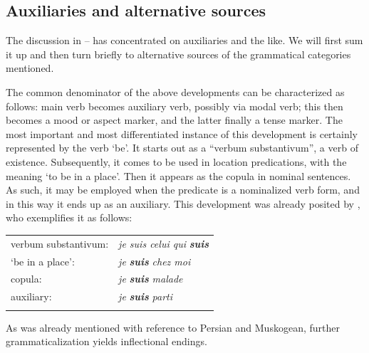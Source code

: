 \subsection{Auxiliaries and alternative sources} \label{sec:3.1.6}

The discussion in -- has concentrated on auxiliaries and the like. We will first sum it up and then turn briefly to alternative sources of the grammatical categories mentioned.

The common denominator of the above developments can be characterized as follows: main verb becomes auxiliary verb, possibly via modal verb; this then becomes a mood or aspect marker, and the latter finally a tense marker. The most important and most differentiated instance of this development is certainly represented by the verb ‘be’. It starts out as a ``verbum substantivum'', a verb of existence. Subsequently, it comes to be used in location predications, with the meaning ‘to be in a place’. Then it appears as the copula in nominal sentences. As such, it may be employed when the predicate is a nominalized verb form, and in this way it ends up as an auxiliary. This development was already posited by \citet[131]{Meillet1912}, who exemplifies it as follows:\enlargethispage{2\baselineskip}

\begin{longtable}{ll}
\lsptoprule
verbum substantivum: & \textit{je suis celui qui }\textbf{\textit{suis}}\\
‘be in a place’: & \textit{je }\textbf{\textit{suis}}\textit{ chez moi}\\
copula: & \textit{je }\textbf{\textit{suis}}\textit{ malade}\\
auxiliary: & \textit{je }\textbf{\textit{suis}}\textit{ parti}\\
\lspbottomrule
\end{longtable}

As was already mentioned with reference to Persian and Muskogean, further grammaticalization yields inflectional endings.

